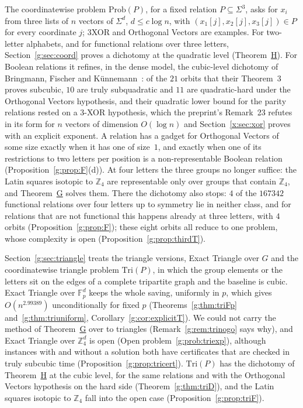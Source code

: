 \documentclass[11pt]{article}
\theoremstyle{definition}
\theoremstyle{remark}
\newcommand{\Z}{\mathbb{Z}}
\newcommand{\Fp}{\mathbb{F}_p}
\newcommand{\Prob}{\mathrm{Prob}}
\newcommand{\ExpTriBestUp}{2.99389}%
\begin{document}
The coordinatewise problem $\Prob(P)$, for a fixed relation $P\subseteq\Sigma^3$, asks for $x_i$ from three lists of $n$ vectors of $\Sigma^d$, $d\le c\log n$, with $(x_1[j],x_2[j],x_3[j])\in P$ for every coordinate $j$; 3XOR and Orthogonal Vectors are examples. For two-letter alphabets, and for functional relations over three letters, Section~\ref{g:sec:coord} proves a dichotomy at the quadratic level (Theorem~\hyperref[m:introH]{H}). For Boolean relations it refines, in the dense model, the cubic-level dichotomy of Bringmann, Fischer and Künnemann~\cite{BFK19}: of the $21$ orbits that their Theorem~3 proves subcubic, $10$ are truly subquadratic and $11$ are quadratic-hard under the Orthogonal Vectors hypothesis, and their quadratic lower bound for the parity relations rested on a 3-XOR hypothesis, which the preprint's Remark~23 refutes in its form for $n$ vectors of dimension $O(\log n)$ and Section~\ref{x:sec:xor} proves with an explicit exponent. A relation has a gadget for Orthogonal Vectors of some size exactly when it has one of size~$1$, and exactly when one of its restrictions to two letters per position is a non-representable Boolean relation (Proposition~\ref{g:prop:F}(d)). At four letters the three groups no longer suffice: the Latin squares isotopic to $\Z_4$ are representable only over groups that contain $\Z_4$, and Theorem~\hyperref[m:introG]{G} solves them. There the dichotomy also stops: $4$ of the $167342$ functional relations over four letters up to symmetry lie in neither class, and for relations that are not functional this happens already at three letters, with $4$ orbits (Proposition~\ref{g:prop:F}); these eight orbits all reduce to one problem, whose complexity is open (Proposition~\ref{g:prop:thirdT}).

Section~\ref{g:sec:triangle} treats the triangle versions, Exact Triangle over $G$ and the coordinatewise triangle problem $\mathrm{Tri}(P)$, in which the group elements or the letters sit on the edges of a complete tripartite graph and the baseline is cubic. Exact Triangle over $\Fp^d$ keeps the whole saving, uniformly in $p$, which gives $O(n^{\ExpTriBestUp})$ unconditionally for fixed $p$ (Theorems~\ref{g:thm:triFp} and~\ref{g:thm:triuniform}, Corollary~\ref{g:cor:explicitT}). We could not carry the method of Theorem~\hyperref[m:introG]{G} over to triangles (Remark~\ref{g:rem:trinogo} says why), and Exact Triangle over $\Z_4^d$ is open (Open problem~\ref{g:prob:triexp}), although instances with and without a solution both have certificates that are checked in truly subcubic time (Proposition~\ref{g:prop:tricert}). $\mathrm{Tri}(P)$ has the dichotomy of Theorem~\hyperref[m:introH]{H} at the cubic level, for the same relations and with the Orthogonal Vectors hypothesis on the hard side (Theorem~\ref{g:thm:triD}), and the Latin squares isotopic to $\Z_4$ fall into the open case (Proposition~\ref{g:prop:triF}).
\end{document}
